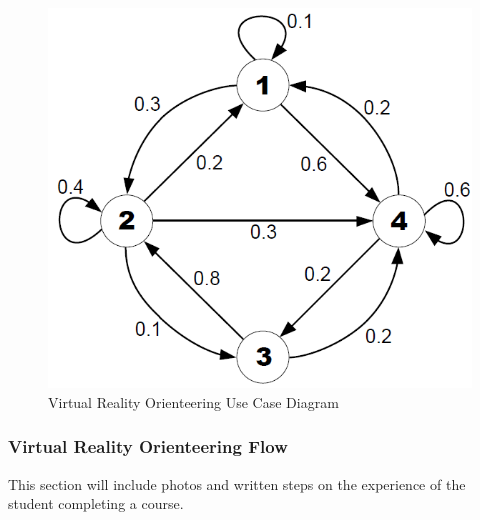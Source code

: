 \begin{figure}[htb]
	\centering
	\includegraphics[width=.5\textwidth]{Requirements/assets/vr-use-case-diagram.png}
	\caption[Virutal Reality Orienteering Use Case Diagram]{\label{Virutal Reality Orienteering Use Case Diagram}Virtual Reality Orienteering Use Case Diagram}
\end{figure}

\subsubsection{Virtual Reality Orienteering Flow}
This section will include photos and written steps on the experience of the student completing a course.